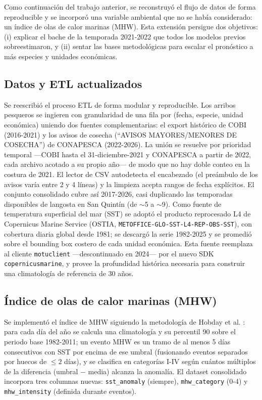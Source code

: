 \label{sec:extension2026}

Como continuación del trabajo anterior, se reconstruyó el flujo de datos de forma reproducible y se incorporó una variable ambiental que no se había considerado: un índice de olas de calor marinas (MHW). Esta extensión persigue dos objetivos: (i) explicar el bache de la temporada 2021-2022 que todos los modelos previos sobreestimaron, y (ii) sentar las bases metodológicas para escalar el pronóstico a más especies y unidades económicas.

\subsection{Datos y ETL actualizados}
Se reescribió el proceso ETL de forma modular y reproducible. Los arribos pesqueros se ingieren con granularidad de una fila por (fecha, especie, unidad económica) uniendo dos fuentes complementarias: el export histórico de COBI (2016-2021) y los avisos de cosecha (``AVISOS MAYORES/MENORES DE COSECHA'') de CONAPESCA (2022-2026). La unión se resuelve por prioridad temporal ---COBI hasta el 31-diciembre-2021 y CONAPESCA a partir de 2022, cada archivo acotado a su propio año--- de modo que no hay doble conteo en la costura de 2021. El lector de CSV autodetecta el encabezado (el preámbulo de los avisos varía entre 2 y 4 líneas) y la limpieza acepta rangos de fecha explícitos. El conjunto consolidado cubre así 2017-2026, casi duplicando las temporadas disponibles de langosta en San Quintín (de $\sim$5 a $\sim$9). Como fuente de temperatura superficial del mar (SST) se adoptó el producto reprocesado L4 de Copernicus Marine Service (OSTIA, \texttt{METOFFICE-GLO-SST-L4-REP-OBS-SST}), con cobertura diaria global desde 1981; se descargó la serie 1982-2025 y se promedió sobre el bounding box costero de cada unidad económica. Esta fuente reemplaza al cliente \texttt{motuclient} —descontinuado en 2024— por el nuevo SDK \texttt{copernicusmarine}, y provee la profundidad histórica necesaria para construir una climatología de referencia de 30 años.

\subsection{Índice de olas de calor marinas (MHW)}
Se implementó el índice de MHW siguiendo la metodología de Hobday et al. \cite{hobday2016}: para cada día del año se calcula una climatología y su percentil 90 sobre el periodo base 1982-2011; un evento MHW es un tramo de al menos 5 días consecutivos con SST por encima de ese umbral (fusionando eventos separados por huecos de $\leq 2$ días), y se clasifica en categorías I-IV según cuántos múltiplos de la diferencia (umbral $-$ media) alcanza la anomalía. El dataset consolidado incorpora tres columnas nuevas: \texttt{sst\_anomaly} (siempre), \texttt{mhw\_category} (0-4) y \texttt{mhw\_intensity} (definida durante eventos).

